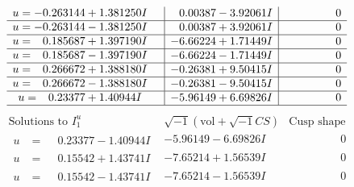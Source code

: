 \documentclass[1p]{elsarticle_modified}
\theoremstyle{definition}
\newcommand{\I}{\sqrt{-1}}
\begin{document}
$$\begin{array}{c|c|c}
\begin{aligned}
u &= -0.263144 + 1.381250 I\end{aligned}
 & \phantom{-}0.00387 - 3.92061 I & \phantom{-0.000000 } 0 \\ \hline\begin{aligned}
u &= -0.263144 - 1.381250 I\end{aligned}
 & \phantom{-}0.00387 + 3.92061 I & \phantom{-0.000000 } 0 \\ \hline\begin{aligned}
u &= \phantom{-}0.185687 + 1.397190 I\end{aligned}
 & -6.66224 + 1.71449 I & \phantom{-0.000000 } 0 \\ \hline\begin{aligned}
u &= \phantom{-}0.185687 - 1.397190 I\end{aligned}
 & -6.66224 - 1.71449 I & \phantom{-0.000000 } 0 \\ \hline\begin{aligned}
u &= \phantom{-}0.266672 + 1.388180 I\end{aligned}
 & -0.26381 + 9.50415 I & \phantom{-0.000000 } 0 \\ \hline\begin{aligned}
u &= \phantom{-}0.266672 - 1.388180 I\end{aligned}
 & -0.26381 - 9.50415 I & \phantom{-0.000000 } 0 \\ \hline\begin{aligned}
u &= \phantom{-}0.23377 + 1.40944 I\end{aligned}
 & -5.96149 + 6.69826 I & \phantom{-0.000000 } 0\\
 \hline 
 \end{array}$$\newpage$$\begin{array}{c|c|c}  
\text{Solutions to }I^u_{1}& \I (\text{vol} + \sqrt{-1}CS) & \text{Cusp shape}\\
 \hline 
\begin{aligned}
u &= \phantom{-}0.23377 - 1.40944 I\end{aligned}
 & -5.96149 - 6.69826 I & \phantom{-0.000000 } 0 \\ \hline\begin{aligned}
u &= \phantom{-}0.15542 + 1.43741 I\end{aligned}
 & -7.65214 + 1.56539 I & \phantom{-0.000000 } 0 \\ \hline\begin{aligned}
u &= \phantom{-}0.15542 - 1.43741 I\end{aligned}
 & -7.65214 - 1.56539 I & \phantom{-0.000000 } 0 \\ \hline\begin{aligned}

\end{aligned}
\end{array}$$
\end{document}
